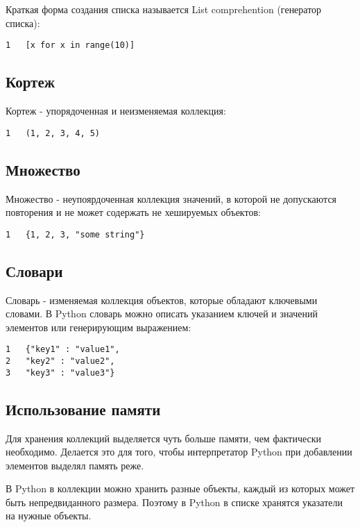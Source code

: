 \documentclass[12pt, a4paper]{article}
\begin{document}
\vspace{1em}

Краткая форма создания списка называется
List comprehention (генератор списка):
\begin{verbatim}
1   [x for x in range(10)]
\end{verbatim}

\subsection{Кортеж}

Кортеж - упорядоченная и неизменяемая коллекция:
\begin{verbatim}
1   (1, 2, 3, 4, 5)
\end{verbatim}

\subsection{Множество}

Множество - неупоярдоченная коллекция значений, 
в которой не допускаются повторения
и не может содержать не хешируемых объектов:
\begin{verbatim}
1   {1, 2, 3, "some string"}
\end{verbatim}

\subsection{Словари}

Словарь - изменяемая коллекция объектов, которые 
обладают ключевыми словами. В Python словарь можно
описать указанием ключей и значений элементов
или генерирующим выражением:
\begin{verbatim}
1   {"key1" : "value1",
2   "key2" : "value2",
3   "key3" : "value3"}
\end{verbatim} 

\subsection{Использование памяти}

Для хранения коллекций выделяется чуть больше памяти,
чем фактически необходимо. Делается это для того, 
чтобы интерпретатор Python при добавлении элементов
выделял память реже.

\vspace{1em}

В Python в коллекции можно хранить разные объекты, 
каждый из которых может быть непредвиданного размера.
Поэтому в Python в списке хранятся указатели на нужные объекты.
\end{document}
